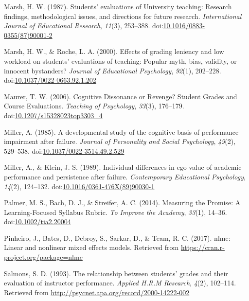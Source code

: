 \documentclass[man]{apa6}
\theoremstyle{definition}
\theoremstyle{definition}
\theoremstyle{definition}
\theoremstyle{remark}
\begin{document}
\hypertarget{ref-Marsh1987}{}
Marsh, H. W. (1987). Students' evaluations of University teaching:
Research findings, methodological issues, and directions for future
research. \emph{International Journal of Educational Research},
\emph{11}(3), 253--388.
doi:\href{https://doi.org/10.1016/0883-0355(87)90001-2}{10.1016/0883-0355(87)90001-2}

\hypertarget{ref-Marsh2000}{}
Marsh, H. W., \& Roche, L. A. (2000). Effects of grading leniency and
low workload on students' evaluations of teaching: Popular myth, bias,
validity, or innocent bystanders? \emph{Journal of Educational
Psychology}, \emph{92}(1), 202--228.
doi:\href{https://doi.org/10.1037/0022-0663.92.1.202}{10.1037/0022-0663.92.1.202}

\hypertarget{ref-Maurer2006}{}
Maurer, T. W. (2006). Cognitive Dissonance or Revenge? Student Grades
and Course Evaluations. \emph{Teaching of Psychology}, \emph{33}(3),
176--179.
doi:\href{https://doi.org/10.1207/s15328023top3303_4}{10.1207/s15328023top3303\_4}

\hypertarget{ref-Miller1985}{}
Miller, A. (1985). A developmental study of the cognitive basis of
performance impairment after failure. \emph{Journal of Personality and
Social Psychology}, \emph{49}(2), 529--538.
doi:\href{https://doi.org/10.1037/0022-3514.49.2.529}{10.1037/0022-3514.49.2.529}

\hypertarget{ref-Miller1989}{}
Miller, A., \& Klein, J. S. (1989). Individual differences in ego value
of academic performance and persistence after failure.
\emph{Contemporary Educational Psychology}, \emph{14}(2), 124--132.
doi:\href{https://doi.org/10.1016/0361-476X(89)90030-1}{10.1016/0361-476X(89)90030-1}

\hypertarget{ref-Palmer2014}{}
Palmer, M. S., Bach, D. J., \& Streifer, A. C. (2014). Measuring the
Promise: A Learning-Focused Syllabus Rubric. \emph{To Improve the
Academy}, \emph{33}(1), 14--36.
doi:\href{https://doi.org/10.1002/tia2.20004}{10.1002/tia2.20004}

\hypertarget{ref-Pinheiro2017}{}
Pinheiro, J., Bates, D., Debroy, S., Sarkar, D., \& Team, R. C. (2017).
nlme: Linear and nonlinear mixed effects models. Retrieved from
\url{https://cran.r-project.org/package=nlme}

\hypertarget{ref-Salmons1993}{}
Salmons, S. D. (1993). The relationship between students' grades and
their evaluation of instructor performance. \emph{Applied H.R.M
Research}, \emph{4}(2), 102--114. Retrieved from
\url{http://psycnet.apa.org/record/2000-14222-002}
\end{document}

